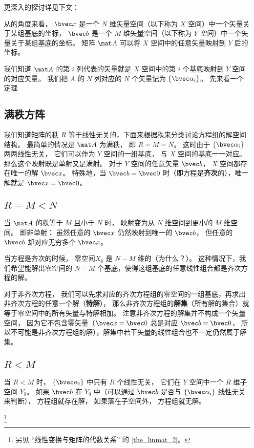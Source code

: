 更深入的探讨详见下文：

从的角度来看， $\bvec x$ 是一个 $N$ 维矢量空间（以下称为 $X$ 空间）中一个矢量关于某组基底的坐标， $\bvec b$ 是一个 $M$ 维矢量空间（以下称为 $Y$ 空间）中一个矢量关于某组基底的坐标。 矩阵 $\mat A$ 可以将 $X$ 空间中的任意矢量映射到 $Y$ 后的坐标。

我们知道 $\mat A$ 的第 $i$ 列代表的矢量就是 $X$ 空间中的第 $i$ 个基底映射到 $Y$ 空间的对应矢量。 我们把 $A$ 的 $N$ 列对应的 $N$ 个矢量记为 $\{\bvec \alpha_i\}$。 先来看一个定理

\subsection{满秩方阵}
我们知道矩阵的秩 $R$ 等于线性无关的，下面来根据秩来分类讨论方程组的解空间结构。 最简单的情况是 $\mat A$ 为满秩， 即 $R = M = N$。 这时由于 $\{\bvec \alpha_i\}$ 两两线性无关， 它们可以作为 $Y$ 空间的一组基底， 与 $X$ 空间的基底一一对应。 那么这个映射既是单射又是满射。%
对于 $Y$ 空间的任意矢量 $\bvec b$， $X$ 空间都存在唯一的解 $\bvec x$。 特殊地，当 $\bvec b = \bvec 0$ 时（即方程是\textbf{齐次}的），唯一解就是 $\bvec x = \bvec 0$。

\subsection{$R = M < N$}\label{sub_LinEq_1}

当 $\mat A$ 的秩等于 $M$ 且小于 $N$ 时， 映射变为从 $N$ 维空间到更小的 $M$ 维空间。 即非单射： 虽然任意的 $\bvec x$ 仍然映射到唯一的 $\bvec b$， 但任意的 $\bvec b$ 却对应无穷多个 $\bvec x$。 


当方程是齐次的时候， 零空间$X_0$ 是 $N- M$ 维的（为什么？）。 这种情况下，我们希望能解出零空间的 $N - M$ 个基底，使得这组基底的任意线性组合都是齐次方程的解。

对于非齐次方程， 我们可以先求对应的齐次方程组的零空间的一组基底，再求出非齐次方程的任意一个解（\textbf{特解}）， 那么非齐次方程组的\textbf{解集}（所有解的集合）就等于零空间中的所有矢量与特解相加。 注意非齐次方程的解集并不构成一个矢量空间， 因为它不包含零矢量（$\bvec x = \bvec 0$ 总是对应 $\bvec b = \bvec 0$， 所以不可能是非齐次方程组的解），解集中若干矢量的线性组合也不一定仍然属于解集。

\subsection{$R < M$}
当 $R < M$ 时， $\{\bvec \alpha_i\}$ 中只有 $R$ 个线性无关， 它们在 $Y$ 空间中一个 $R$ 维子空间 $Y_0$。 如果 $\bvec b$ 在 $Y_0$ 中（可以通过 $\bvec b$ 是否与 $\{\bvec \alpha_i\}$ 线性无关来判断）， 方程组就存在解， 如果落在子空间外， 方程组就无解。

\footnote{另见 “线性变换与矩阵的代数关系” 的 \autoref{the_linmat_2}。}
